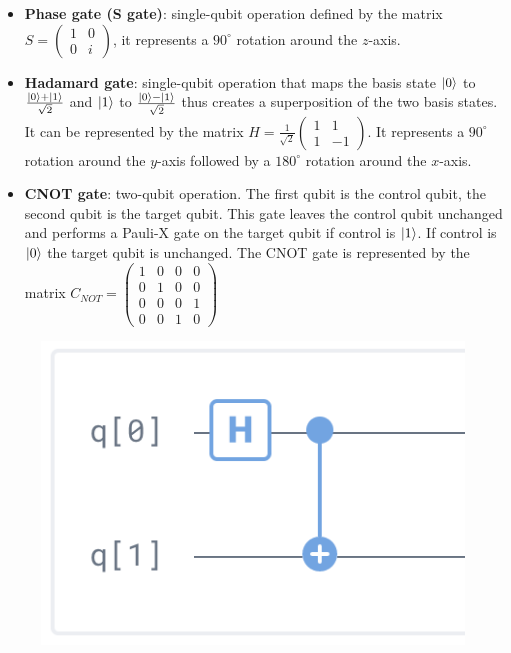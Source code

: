 	\begin{multicols}{2}
		\begin{itemize}
		\item \textbf{Phase gate (S gate)}: single-qubit operation defined by the matrix $S=\begin{pmatrix}1&0\\0&i \end{pmatrix}$, it represents a $90^\circ$ rotation around the $z$-axis.
		\item \textbf{Hadamard gate}: single-qubit operation that maps the basis state $\ket{0}$ to $\frac{\ket{0}+\ket{1}}{\sqrt{2}}$ and $\ket{1}$ to $\frac{\ket{0}-\ket{1}}{\sqrt{2}}$ thus creates a superposition of the two basis states.
			It can be represented by the matrix $H=\frac{1}{\sqrt{2}}\begin{pmatrix} 1&1\\1&-1\end{pmatrix}$.
			It represents a $90^{\circ}$ rotation around the $y$-axis followed by a $180^{\circ}$ rotation around the $x$-axis.
		\item \textbf{CNOT gate}: two-qubit operation.
			The first qubit is the control qubit, the second qubit is the target qubit.
			This gate leaves the control qubit unchanged and performs a Pauli-X gate on the target qubit if control is $\ket{1}$.
			If control is $\ket{0}$ the target qubit is unchanged.
			The CNOT gate is represented by the matrix $C_{NOT} = \begin{pmatrix}1&0&0&0\\0&1&0&0\\0&0&0&1\\0&0&1&0 \end{pmatrix}$
		\end{itemize}
	\end{multicols}

	\begin{figure}[htbp!]
		\centering
		\includegraphics[scale=0.30]{img_11}
	\end{figure}

